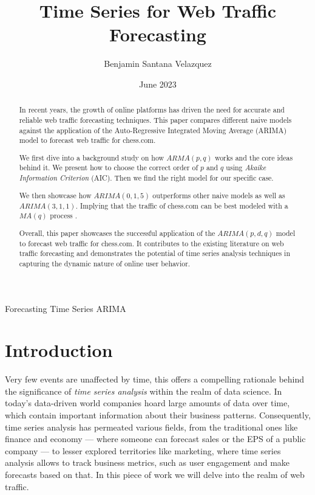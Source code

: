 \documentclass[journal]{IEEEtran}
\title{Time Series for Web Traffic Forecasting}
\author{Benjamin Santana Velazquez}
\date{June 2023}
\begin{document}
\maketitle

\begin{abstract}
    In recent years, the growth of online platforms has driven the need for
    accurate and reliable web traffic forecasting techniques. This paper
    compares different naive models against the application of the
    Auto-Regressive Integrated Moving Average (ARIMA) model to forecast web
    traffic for chess.com.

    We first dive into a background study on how $ARMA(p,q)$ works and the core
    ideas behind it. We present how to choose the correct order of $p$ and $q$
    using \emph{Akaike Information Criterion} (AIC). Then we find the right
    model for our specific case. 

    We then showcase how $ARIMA(0,1,5)$ outperforms other naive models as well
    as $ARIMA(3,1,1)$. Implying that the traffic of chess.com can be best
    modeled with a $MA(q)$ process .

    Overall, this paper showcases the successful application of the
    $ARIMA(p,d,q)$ model to forecast web traffic for chess.com. It contributes
    to the existing literature on web traffic forecasting and demonstrates the
    potential of time series analysis techniques in capturing the dynamic
    nature of online user behavior.
\end{abstract}

\begin{IEEEkeywords}
    Forecasting
    Time Series
    ARIMA
\end{IEEEkeywords}

\section{Introduction}\label{sec:intro}
Very few events are unaffected by time, this offers a compelling rationale
behind the significance of \emph{time series analysis} within the
realm of data science. In today's data-driven world companies hoard large
amounts of data over time, which contain important information about their
business patterns. Consequently, time series analysis has permeated various
fields, from the traditional ones like finance and economy --- where someone
can forecast sales or the EPS of a public company --- to lesser explored
territories like marketing, where time series analysis allows to track business
metrics, such as user engagement and make forecasts based on that. In this
piece of work we will delve into the realm of web traffic.
\end{document}
